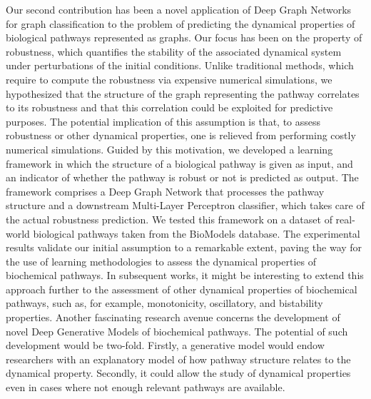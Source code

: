 Our second contribution has been a novel application of Deep Graph Networks for graph classification to the problem of predicting the dynamical properties of biological pathways represented as graphs. Our focus has been on the property of robustness, which quantifies the stability of the associated dynamical system under perturbations of the initial conditions. Unlike traditional methods, which require to compute the robustness via expensive numerical simulations, we hypothesized that the structure of the graph representing the pathway correlates to its robustness and that this correlation could be exploited for predictive purposes. The potential implication of this assumption is that, to assess robustness or other dynamical properties, one is relieved from performing costly numerical simulations. Guided by this motivation, we developed a learning framework in which the structure of a biological pathway is given as input, and an indicator of whether the pathway is robust or not is predicted as output. The framework comprises a Deep Graph Network that processes the pathway structure and a downstream Multi-Layer Perceptron classifier, which takes care of the actual robustness prediction. We tested this framework on a dataset of real-world biological pathways taken from the BioModels database. The experimental results validate our initial assumption to a remarkable extent, paving the way for the use of learning methodologies to assess the dynamical properties of biochemical pathways. In subsequent works, it might be interesting to extend this approach further to the assessment of other dynamical properties of biochemical pathways, such as, for example, monotonicity, oscillatory, and bistability properties. Another fascinating research avenue concerns the development of novel Deep Generative Models of biochemical pathways. The potential of such development would be two-fold. Firstly, a generative model would endow researchers with an explanatory model of how pathway structure relates to the dynamical property. Secondly, it could allow the study of dynamical properties even in cases where not enough relevant pathways are available.
\vspace{1em}

